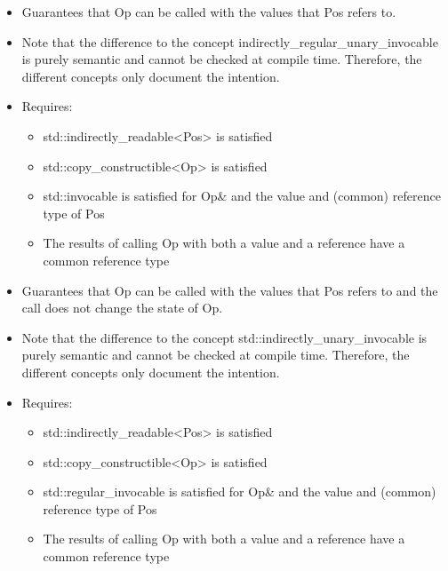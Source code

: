 

\begin{itemize}
\item
Guarantees that Op can be called with the values that Pos refers to.

\item
Note that the difference to the concept indirectly\_regular\_unary\_invocable is purely semantic and cannot be checked at compile time. Therefore, the different concepts only document the intention.

\item
Requires:
\begin{itemize}
\item
std::indirectly\_readable<Pos> is satisfied

\item
std::copy\_constructible<Op> is satisfied

\item
std::invocable is satisfied for Op\& and the value and (common) reference type of Pos

\item
The results of calling Op with both a value and a reference have a common reference type
\end{itemize}
\end{itemize}


\begin{itemize}
\item
Guarantees that Op can be called with the values that Pos refers to and the call does not change the state of Op.

\item
Note that the difference to the concept std::indirectly\_unary\_invocable is purely semantic and cannot be checked at compile time. Therefore, the different concepts only document the intention.

\item
Requires:
\begin{itemize}
\item
std::indirectly\_readable<Pos> is satisfied

\item
std::copy\_constructible<Op> is satisfied

\item
std::regular\_invocable is satisfied for Op\& and the value and (common) reference type of Pos

\item
The results of calling Op with both a value and a reference have a common reference type
\end{itemize}
\end{itemize}

